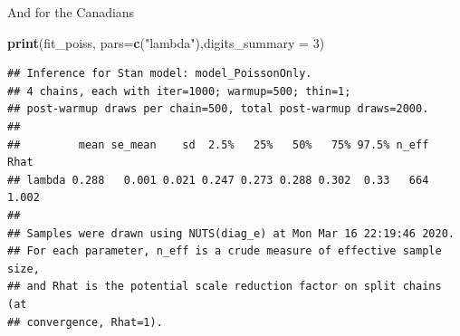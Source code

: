 \documentclass[]{article}
\newenvironment{Shaded}{\begin{snugshade}}{\end{snugshade}}
\newcommand{\CommentTok}[1]{\textcolor[rgb]{0.56,0.35,0.01}{\textit{#1}}}
\newcommand{\DataTypeTok}[1]{\textcolor[rgb]{0.13,0.29,0.53}{#1}}
\newcommand{\DecValTok}[1]{\textcolor[rgb]{0.00,0.00,0.81}{#1}}
\newcommand{\KeywordTok}[1]{\textcolor[rgb]{0.13,0.29,0.53}{\textbf{#1}}}
\newcommand{\NormalTok}[1]{#1}
\newcommand{\OperatorTok}[1]{\textcolor[rgb]{0.81,0.36,0.00}{\textbf{#1}}}
\newcommand{\StringTok}[1]{\textcolor[rgb]{0.31,0.60,0.02}{#1}}
\begin{document}
And for the Canadians

\begin{Shaded}
\end{Shaded}

\begin{Shaded}
\begin{Highlighting}[]
\KeywordTok{print}\NormalTok{(fit_poiss, }\DataTypeTok{pars=}\KeywordTok{c}\NormalTok{(}\StringTok{"lambda"}\NormalTok{),}\DataTypeTok{digits_summary =} \DecValTok{3}\NormalTok{)}
\end{Highlighting}
\end{Shaded}

\begin{verbatim}
## Inference for Stan model: model_PoissonOnly.
## 4 chains, each with iter=1000; warmup=500; thin=1; 
## post-warmup draws per chain=500, total post-warmup draws=2000.
## 
##         mean se_mean    sd  2.5%   25%   50%   75% 97.5% n_eff  Rhat
## lambda 0.288   0.001 0.021 0.247 0.273 0.288 0.302  0.33   664 1.002
## 
## Samples were drawn using NUTS(diag_e) at Mon Mar 16 22:19:46 2020.
## For each parameter, n_eff is a crude measure of effective sample size,
## and Rhat is the potential scale reduction factor on split chains (at 
## convergence, Rhat=1).
\end{verbatim}
\end{document}
